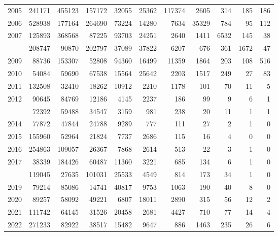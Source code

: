 \documentclass[
]{article}
\begin{document}
\begin{longtable}[t]{lrrrrrrrrrr}
2005 & 241171 & 455123 & 157172 & 32055 & 25362 & 117374 & 2605 & 314 & 185 & 186\\
2006 & 528938 & 177164 & 264690 & 73224 & 14280 & 7634 & 35329 & 784 & 95 & 112\\
2007 & 125893 & 368568 & 87225 & 93703 & 24251 & 2640 & 1411 & 6532 & 145 & 38\\
\addlinespace
2008 & 208747 & 90870 & 202797 & 37089 & 37822 & 6207 & 676 & 361 & 1672 & 47\\
2009 & 88736 & 153307 & 52808 & 94360 & 16499 & 11359 & 1864 & 203 & 108 & 516\\
2010 & 54084 & 59690 & 67538 & 15564 & 25642 & 2203 & 1517 & 249 & 27 & 83\\
2011 & 132508 & 32410 & 18262 & 10912 & 2210 & 1178 & 101 & 70 & 11 & 5\\
2012 & 90645 & 84769 & 12186 & 4145 & 2237 & 186 & 99 & 9 & 6 & 1\\
\addlinespace
2013 & 72392 & 59488 & 34547 & 3159 & 981 & 238 & 20 & 11 & 1 & 1\\
2014 & 77872 & 47844 & 24788 & 9289 & 777 & 111 & 27 & 2 & 1 & 0\\
2015 & 155960 & 52964 & 21824 & 7737 & 2686 & 115 & 16 & 4 & 0 & 0\\
2016 & 254863 & 109057 & 26367 & 7868 & 2614 & 513 & 22 & 3 & 1 & 0\\
2017 & 38339 & 184426 & 60487 & 11360 & 3221 & 685 & 134 & 6 & 1 & 0\\
\addlinespace
2018 & 119045 & 27635 & 101031 & 25533 & 4549 & 814 & 173 & 34 & 1 & 0\\
2019 & 79214 & 85086 & 14741 & 40817 & 9753 & 1063 & 190 & 40 & 8 & 0\\
2020 & 89257 & 58092 & 49221 & 6807 & 18011 & 2890 & 315 & 56 & 12 & 2\\
2021 & 111742 & 64145 & 31526 & 20458 & 2681 & 4427 & 710 & 77 & 14 & 4\\
2022 & 271233 & 82922 & 38517 & 15482 & 9647 & 886 & 1463 & 235 & 26 & 6\\*
\end{longtable}
\end{document}
